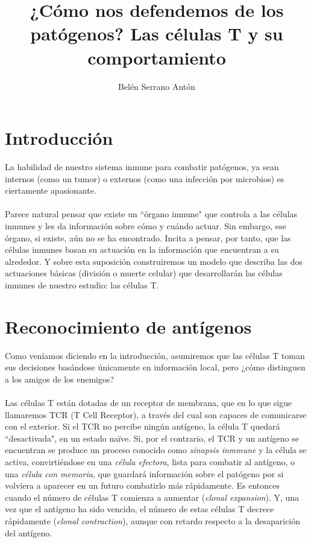 \documentclass{article}
\title{¿Cómo nos defendemos de los patógenos? Las células T y su comportamiento}
\author{Belén Serrano Antón }
\begin{document}
	
	\begin{titlepage}
		\maketitle
	\end{titlepage}
	
	\section{Introducción}
	La habilidad de nuestro sistema inmune para combatir patógenos, ya sean internos (como un tumor) o externos (como una infección por microbios) es ciertamente apasionante. 
	\\
	\\
	Parece natural pensar que existe un ``órgano inmune" que controla a las células inmunes y les da información sobre cómo y cuándo actuar. Sin embargo, ese órgano, si existe, aún no se ha encontrado. Incita a pensar, por tanto, que las células inmunes basan su actuación en la información que encuentran a su alrededor. Y sobre esta suposición construiremos un modelo que describa las dos actuaciones básicas (división o muerte celular) que desarrollarán las células inmunes de nuestro estudio: las células T.
	
	\section{Reconocimiento de antígenos}
	 Como veníamos diciendo en la introducción, asumiremos que las células T toman sus decisiones basándose únicamente en información local, pero ¿cómo distinguen a los amigos de los enemigos?
	 \\
	 \\
	 Las células T están dotadas de un receptor de membrana, que en lo que sigue llamaremos TCR (T Cell Receptor), a través del cual son capaces de comunicarse con el exterior. Si el TCR no percibe ningún antígeno, la célula T quedará ``desactivada", en un estado naïve. Si, por el contrario, el TCR y un antígeno se encuentran se produce un proceso conocido como \textit{sinapsis inmmune} y la célula se activa, convirtiéndose en una \textit{célula efectora}, lista para combatir al antígeno, o una \textit{célula con memoria}, que guardará información sobre el patógeno por si volviera a aparecer en un futuro combatirlo más rápidamente. Es entonces cuando el número de células T comienza a aumentar (\textit{clonal expansion}). Y, una vez que el antígeno ha sido vencido, el número de estas células T decrece rápidamente (\textit{clonal contraction}), aunque con retardo respecto a la desaparición del antígeno.
	 
\end{document}

